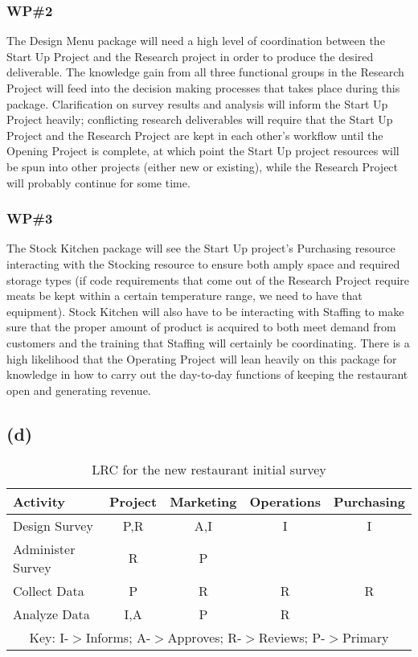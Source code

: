 \documentclass{article}
\begin{document}
	\subsubsection*{WP\#2}
	The Design Menu package will need a high level of coordination between the Start Up Project and the Research project in order to produce the desired deliverable. The knowledge gain from all three functional groups in the 		Research Project will feed into the decision making processes that takes place during this package. Clarification on survey results and analysis will inform the Start Up Project heavily; conflicting research deliverables will require 		that the Start Up Project and the Research Project are kept in each other's workflow until the Opening Project is complete, at which point the Start Up project resources will be spun into other projects (either new or existing), while 	the Research Project will probably 	continue for some time.
	\subsubsection*{WP\#3}
	The Stock Kitchen package will see the Start Up project's Purchasing resource interacting with the Stocking resource to ensure both amply space and required storage types (if code requirements that come out of the Research 		Project require meats be kept within a certain temperature range, we need to have that equipment). Stock Kitchen will also have to be interacting with Staffing to make sure that the proper amount of product is acquired to both meet 	demand from customers and the training that Staffing will certainly be coordinating. 
	\newline
	There is a high likelihood that the Operating Project will lean heavily on this package for knowledge in how to carry out the day-to-day functions of keeping the restaurant open and generating revenue.
		
	\subsection*{\quad(d)}
	\begin{table}[h!]
  		\begin{center}
    		\caption{LRC for the new restaurant initial survey}
    		\label{tab:table1}
			
    		\begin{tabular}{lcccc}
				Activity & Project & Marketing & Operations & Purchasing\\
				\hline
      			Design Survey & P,R & A,I & I & I\\
      			Administer Survey & R & P &  & \\
				Collect Data & P & R & R & R \\
				Analyze Data & I,A & P & R & \\
				\hline
				
				\multicolumn{5}{c}{Key: I-$>$Informs; A-$>$Approves; R-$>$Reviews; P-$>$Primary} \\
    		\end{tabular}
  		\end{center}
	\end{table}
	
\end{document}
